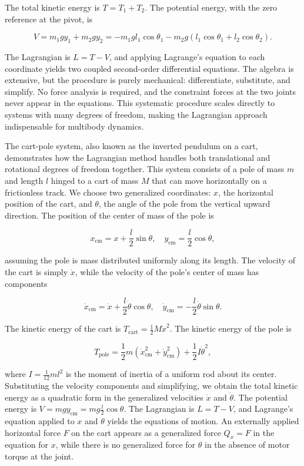 The total kinetic energy is $T = T_1 + T_2$. The potential energy, with the zero reference at the pivot, is

$$V = m_1 g y_1 + m_2 g y_2 = -m_1 g l_1 \cos \theta_1 - m_2 g (l_1 \cos \theta_1 + l_2 \cos \theta_2).$$

The Lagrangian is $L = T - V$, and applying Lagrange's equation to each coordinate yields two coupled second-order differential equations. The algebra is extensive, but the procedure is purely mechanical: differentiate, substitute, and simplify. No force analysis is required, and the constraint forces at the two joints never appear in the equations. This systematic procedure scales directly to systems with many degrees of freedom, making the Lagrangian approach indispensable for multibody dynamics.

The cart-pole system, also known as the inverted pendulum on a cart, demonstrates how the Lagrangian method handles both translational and rotational degrees of freedom together. This system consists of a pole of mass $m$ and length $l$ hinged to a cart of mass $M$ that can move horizontally on a frictionless track. We choose two generalized coordinates: $x$, the horizontal position of the cart, and $\theta$, the angle of the pole from the vertical upward direction. The position of the center of mass of the pole is

$$x_{\text{cm}} = x + \frac{l}{2} \sin \theta, \quad y_{\text{cm}} = \frac{l}{2} \cos \theta,$$

assuming the pole is mass distributed uniformly along its length. The velocity of the cart is simply $\dot{x}$, while the velocity of the pole's center of mass has components

$$\dot{x}_{\text{cm}} = \dot{x} + \frac{l}{2} \dot{\theta} \cos \theta, \quad \dot{y}_{\text{cm}} = -\frac{l}{2} \dot{\theta} \sin \theta.$$

The kinetic energy of the cart is $T_{\text{cart}} = \frac{1}{2} M \dot{x}^2$. The kinetic energy of the pole is

$$T_{\text{pole}} = \frac{1}{2} m (\dot{x}_{\text{cm}}^2 + \dot{y}_{\text{cm}}^2) + \frac{1}{2} I \dot{\theta}^2,$$

where $I = \frac{1}{12} m l^2$ is the moment of inertia of a uniform rod about its center. Substituting the velocity components and simplifying, we obtain the total kinetic energy as a quadratic form in the generalized velocities $\dot{x}$ and $\dot{\theta}$. The potential energy is $V = mg y_{\text{cm}} = mg \frac{l}{2} \cos \theta$. The Lagrangian is $L = T - V$, and Lagrange's equation applied to $x$ and $\theta$ yields the equations of motion. An externally applied horizontal force $F$ on the cart appears as a generalized force $Q_x = F$ in the equation for $x$, while there is no generalized force for $\theta$ in the absence of motor torque at the joint.

